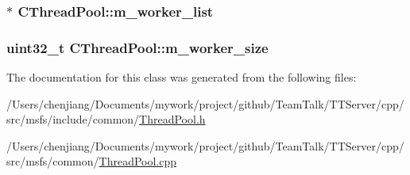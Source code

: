 \subsubsection[{m\+\_\+worker\+\_\+list}]{$\ast$ C\+Thread\+Pool\+::m\+\_\+worker\+\_\+list\hspace{0.3cm}{\ttfamily [private]}}\label{class_c_thread_pool_ab859c55dd0db1ef0ba9b4f686ba51a83}
\hypertarget{class_c_thread_pool_aa2d4a7c170bf2862e3c74eb7d6fd85d4}{}
\subsubsection[{m\+\_\+worker\+\_\+size}]{\setlength{\rightskip}{0pt plus 5cm}uint32\+\_\+t C\+Thread\+Pool\+::m\+\_\+worker\+\_\+size\hspace{0.3cm}{\ttfamily [private]}}\label{class_c_thread_pool_aa2d4a7c170bf2862e3c74eb7d6fd85d4}


The documentation for this class was generated from the following files\+:\begin{DoxyCompactItemize}
\item 
/\+Users/chenjiang/\+Documents/mywork/project/github/\+Team\+Talk/\+T\+T\+Server/cpp/src/msfs/include/common/\hyperlink{_thread_pool_8h}{Thread\+Pool.\+h}\item 
/\+Users/chenjiang/\+Documents/mywork/project/github/\+Team\+Talk/\+T\+T\+Server/cpp/src/msfs/common/\hyperlink{_thread_pool_8cpp}{Thread\+Pool.\+cpp}\end{DoxyCompactItemize}

